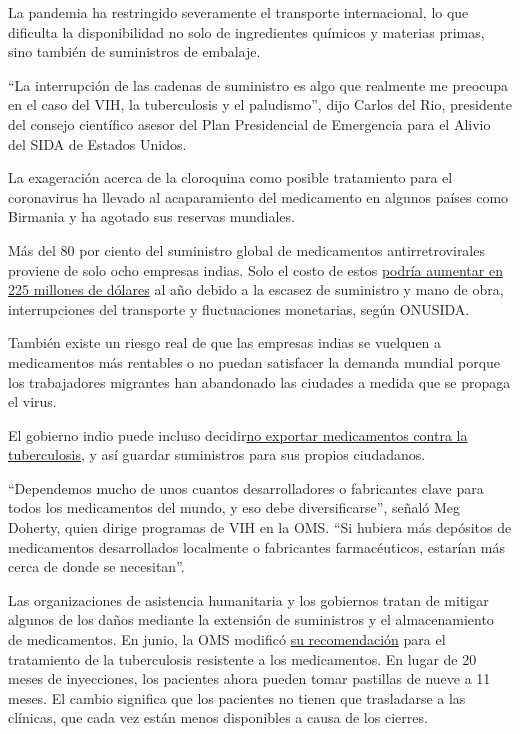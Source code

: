 La pandemia ha restringido severamente el transporte internacional, lo
que dificulta la disponibilidad no solo de ingredientes químicos y
materias primas, sino también de suministros de embalaje.

``La interrupción de las cadenas de suministro es algo que realmente me
preocupa en el caso del VIH, la tuberculosis y el paludismo'', dijo
Carlos del Rio, presidente del consejo científico asesor del Plan
Presidencial de Emergencia para el Alivio del SIDA de Estados Unidos.

La exageración acerca de la cloroquina como posible tratamiento para el
coronavirus ha llevado al acaparamiento del medicamento en algunos
países como Birmania y ha agotado sus reservas mundiales.

Más del 80 por ciento del suministro global de medicamentos
antirretrovirales proviene de solo ocho empresas indias. Solo el costo
de estos
\href{https://www.unaids.org/en/resources/presscentre/pressreleaseandstatementarchive/2020/june/20200622_availability-and-cost-of-antiretroviral-medicines}{podría
aumentar en 225 millones de dólares} al año debido a la escasez de
suministro y mano de obra, interrupciones del transporte y fluctuaciones
monetarias, según ONUSIDA.

También existe un riesgo real de que las empresas indias se vuelquen a
medicamentos más rentables o no puedan satisfacer la demanda mundial
porque los trabajadores migrantes han abandonado las ciudades a medida
que se propaga el virus.

El gobierno indio puede incluso
decidir\href{https://theprint.in/health/india-could-ban-export-of-anti-tb-drugs-as-lockdown-hits-production/406119/}{no
exportar medicamentos contra la tuberculosis}, y así guardar suministros
para sus propios ciudadanos.

``Dependemos mucho de unos cuantos desarrolladores o fabricantes clave
para todos los medicamentos del mundo, y eso debe diversificarse'',
señaló Meg Doherty, quien dirige programas de VIH en la OMS. ``Si
hubiera más depósitos de medicamentos desarrollados localmente o
fabricantes farmacéuticos, estarían más cerca de donde se necesitan''.

Las organizaciones de asistencia humanitaria y los gobiernos tratan de
mitigar algunos de los daños mediante la extensión de suministros y el
almacenamiento de medicamentos. En junio, la OMS modificó
\href{https://www.who.int/news-room/detail/15-06-2020-who-urges-countries-to-enable-access-to-fully-oral-drug-resistant-tb-treatment-regimens}{su
recomendación} para el tratamiento de la tuberculosis resistente a los
medicamentos. En lugar de 20 meses de inyecciones, los pacientes ahora
pueden tomar pastillas de nueve a 11 meses. El cambio significa que los
pacientes no tienen que trasladarse a las clínicas, que cada vez están
menos disponibles a causa de los cierres.


